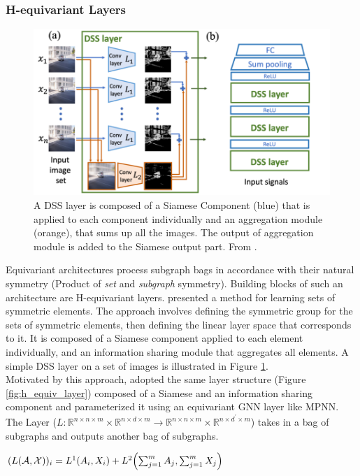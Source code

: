 \documentclass[11pt, dvipsnames, DIV=12]{scrreprt}
\let\originalleft\left
\let\originalright\right
\renewcommand{\left}{\mathopen{}\mathclose\bgroup\originalleft}
\renewcommand{\right}{\aftergroup\egroup\originalright}
\theoremstyle{definition}
\begin{document}
\subsubsection{H-equivariant Layers}
\begin{figure}
    \centering
    \includegraphics[width=.80\textwidth]{figures/dsslayer.png}
    \caption{A DSS layer is composed of a Siamese Component (blue) that is applied to each component individually and an aggregation module (orange), that sums up all the images. The output of aggregation module is added to the Siamese output part. From \cite{haggai_symlearning_2020}.}
    \label{fig:dsslayer}
\end{figure}
Equivariant architectures process subgraph bags in accordance with their natural symmetry (Product of \textit{set} and \textit{subgraph} symmetry). Building blocks of such an architecture are H-equivariant layers. \citep{haggai_symlearning_2020} presented a method for learning sets of symmetric elements. The approach involves defining the symmetric group for the sets of symmetric elements, then defining the linear layer space that corresponds to it. It is composed of a Siamese component applied to each element individually, and an information sharing module that aggregates all elements. A simple DSS layer on a set of images is illustrated in Figure \ref{fig:dsslayer}.\\
Motivated by this approach, \cite{beatrice_esan_2021} adopted the same layer structure (Figure \ref{fig:h_equiv_layer}) composed of a Siamese and an information sharing component and parameterized it using an equivariant GNN layer like MPNN. The Layer ($L: \mathbb{R}^{n \times n \times m} \times \mathbb{R}^{n \times d \times m} \rightarrow \mathbb{R}^{n \times n \times m} \times \mathbb{R}^{n \times d^{\prime} \times m}$) takes in a bag of subgraphs and outputs another bag of subgraphs.
\begin{center}
$(L(\mathcal{A}, \mathcal{X}))_i=L^1\left(A_i, X_i\right)+L^2\left(\sum_{j=1}^m A_j, \sum_{j=1}^m X_j\right)$
\end{center}
\end{document}
